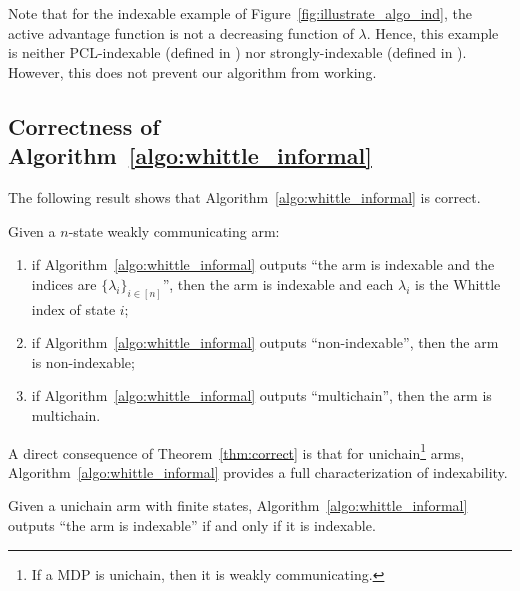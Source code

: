 \noindent Note that for the indexable example of Figure~\ref{fig:illustrate_algo_ind}, the active advantage function is not a decreasing function of $\lambda$. Hence, this example is neither PCL-indexable (defined in \citep[Definition~3]{nino2020fast}) nor strongly-indexable (defined in \cite{nakhleh2021neurwin}). However, this does not prevent our algorithm from working. 

\subsection{Correctness of Algorithm~\ref{algo:whittle_informal}}

The following result shows that Algorithm~\ref{algo:whittle_informal} is correct.

\begin{thm}
    \label{thm:correct}
    Given a $n$-state weakly communicating arm:
    \begin{enumerate}[label=(\roman*)]
        \item \label{it:idx_proof} if Algorithm~\ref{algo:whittle_informal} outputs ``the arm is indexable and the indices are $\{\lambda_i\}_{i\in[n]}$'', then the arm is indexable and each $\lambda_i$ is the Whittle index of state $i$;
        \item \label{it:non_idx_proof} if Algorithm~\ref{algo:whittle_informal} outputs ``non-indexable'', then the arm is non-indexable;
        \item \label{it:multi_chain} if Algorithm~\ref{algo:whittle_informal} outputs ``multichain'', then the arm is multichain.
    \end{enumerate}
\end{thm}
A direct consequence of Theorem~\ref{thm:correct} is that for unichain\footnote{If a MDP is unichain, then it is weakly communicating.} arms, Algorithm~\ref{algo:whittle_informal} provides a full characterization of indexability. 
\begin{cor}
    \label{coro:correct_unichain}
    Given a unichain arm with finite states, Algorithm~\ref{algo:whittle_informal} outputs ``the arm is indexable'' if and only if it is indexable. 
\end{cor}

